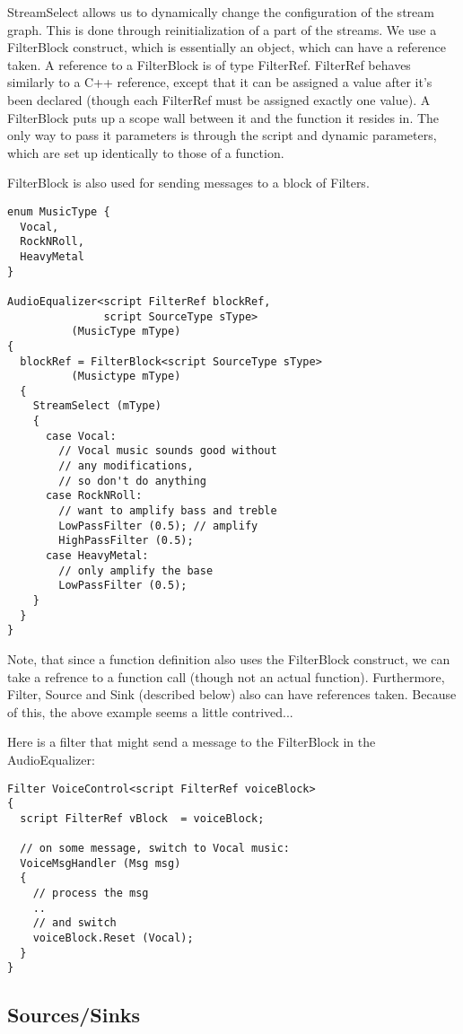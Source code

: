 \documentclass[twocolumn, draft]{article}
\begin{document}
StreamSelect allows us to dynamically change the configuration
of the stream graph.  This is done through reinitialization of 
a part of the streams.  We use a FilterBlock construct, which
is essentially an object, which can have a reference taken.
A reference to a FilterBlock is of type FilterRef.  FilterRef behaves similarly
to a C++ reference, except that it can be assigned a value after it's been
declared (though each FilterRef must be assigned exactly one value).
A FilterBlock puts up a scope wall between it and the function it
resides in.  The only way to pass it parameters is through the
script and dynamic parameters, which are set up identically to
those of a function.

FilterBlock is also used for sending messages to a block of Filters.

\begin{verbatim}
enum MusicType {
  Vocal,
  RockNRoll,
  HeavyMetal
}

AudioEqualizer<script FilterRef blockRef,
               script SourceType sType>
          (MusicType mType)
{
  blockRef = FilterBlock<script SourceType sType>
          (Musictype mType)
  {
    StreamSelect (mType)
    {
      case Vocal:
        // Vocal music sounds good without 
        // any modifications,
        // so don't do anything
      case RockNRoll:
        // want to amplify bass and treble
        LowPassFilter (0.5); // amplify
        HighPassFilter (0.5);
      case HeavyMetal:
        // only amplify the base
        LowPassFilter (0.5);
    }
  }
}
\end{verbatim}

Note, that since a function definition also uses
the FilterBlock construct, we can take a refrence
to a function call (though not an actual function).
Furthermore,  Filter, Source and Sink (described below) also can have
references taken.  Because of this, the above example
seems a little contrived...

Here is a filter that might send a message to the FilterBlock in 
the AudioEqualizer:

\begin{verbatim}
Filter VoiceControl<script FilterRef voiceBlock>
{
  script FilterRef vBlock  = voiceBlock;

  // on some message, switch to Vocal music:
  VoiceMsgHandler (Msg msg)
  {
    // process the msg
    ..
    // and switch
    voiceBlock.Reset (Vocal);
  }
}
\end{verbatim}

\subsection{Sources/Sinks}
\end{document}
